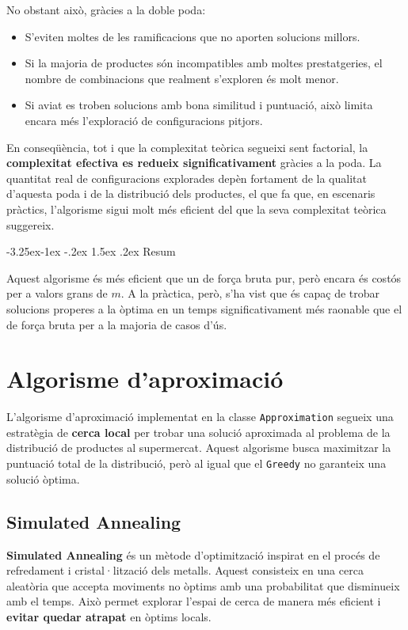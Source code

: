 \documentclass[a4paper,12pt]{report}
\makeatletter
\newcounter{subsubsubsection}[subsubsection]
\newcommand\subsubsubsection{\@startsection{subsubsubsection}{4}{\z@}%
									 {-3.25ex\@plus -1ex \@minus -.2ex}%
									 {1.5ex \@plus .2ex}%
									 {\normalfont\normalsize\bfseries}}
\makeatother
\begin{document}
\begin{itemize}
No obstant això, gràcies a la doble poda:
\begin{itemize}
    \item S'eviten moltes de les ramificacions que no aporten solucions millors.
    \item Si la majoria de productes són incompatibles amb moltes prestatgeries, el nombre de combinacions que realment s'exploren és molt menor.
    \item Si aviat es troben solucions amb bona similitud i puntuació, això limita encara més l'exploració de configuracions pitjors.
\end{itemize}

En conseqüència, tot i que la complexitat teòrica segueixi sent factorial, la \textbf{complexitat efectiva es redueix significativament} gràcies a la poda. La quantitat real de configuracions explorades depèn fortament de la qualitat d'aquesta poda i de la distribució dels productes, el que fa que, en escenaris pràctics, l'algorisme sigui molt més eficient del que la seva complexitat teòrica suggereix.

\subsubsubsection{Resum}

Aquest algorisme és més eficient que un de força bruta pur, però encara és costós per a valors grans de \(m\). A la pràctica, però, s'ha vist que és capaç de trobar solucions properes a la òptima en un temps significativament més raonable que el de força bruta per a la majoria de casos d'ús.

\section{Algorisme d'aproximació}

L'algorisme d'aproximació implementat en la classe \texttt{Approximation} segueix una estratègia de \textbf{cerca local} per trobar una solució aproximada al problema de la distribució de productes al supermercat. Aquest algorisme busca maximitzar la puntuació total de la distribució, però al igual que el \texttt{Greedy} no garanteix una solució òptima.

\subsection{Simulated Annealing}
\textbf{Simulated Annealing} és un mètode d'optimització inspirat en el procés de refredament i cristal·lització dels metalls. Aquest consisteix en una cerca aleatòria que accepta moviments no òptims amb una probabilitat que disminueix amb el temps. Això permet explorar l'espai de cerca de manera més eficient i \textbf{evitar quedar atrapat} en òptims locals.


\end{itemize}
\end{document}
